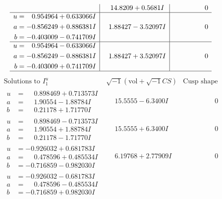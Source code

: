 \documentclass[1p]{elsarticle_modified}
\theoremstyle{definition}
\newcommand{\I}{\sqrt{-1}}
\begin{document}
$$\begin{array}{c|c|c}
 & \phantom{-}14.8209 + 0.5681 I & \phantom{-0.000000 } 0 \\ \hline\begin{aligned}
u &= \phantom{-}0.954964 + 0.633066 I \\
a &= -0.856249 + 0.886381 I \\
b &= -0.403009 - 0.741709 I\end{aligned}
 & \phantom{-}1.88427 - 3.52097 I & \phantom{-0.000000 } 0 \\ \hline\begin{aligned}
u &= \phantom{-}0.954964 - 0.633066 I \\
a &= -0.856249 - 0.886381 I \\
b &= -0.403009 + 0.741709 I\end{aligned}
 & \phantom{-}1.88427 + 3.52097 I & \phantom{-0.000000 } 0\\
 \hline 
 \end{array}$$\newpage$$\begin{array}{c|c|c}  
\text{Solutions to }I^u_{1}& \I (\text{vol} + \sqrt{-1}CS) & \text{Cusp shape}\\
 \hline 
\begin{aligned}
u &= \phantom{-}0.898469 + 0.713573 I \\
a &= \phantom{-}1.90554 - 1.88784 I \\
b &= \phantom{-}0.21178 + 1.71770 I\end{aligned}
 & \phantom{-}15.5555 - 6.3400 I & \phantom{-0.000000 } 0 \\ \hline\begin{aligned}
u &= \phantom{-}0.898469 - 0.713573 I \\
a &= \phantom{-}1.90554 + 1.88784 I \\
b &= \phantom{-}0.21178 - 1.71770 I\end{aligned}
 & \phantom{-}15.5555 + 6.3400 I & \phantom{-0.000000 } 0 \\ \hline\begin{aligned}
u &= -0.926032 + 0.681783 I \\
a &= \phantom{-}0.478596 + 0.485534 I \\
b &= -0.716859 - 0.982030 I\end{aligned}
 & \phantom{-}6.19768 + 2.77909 I & \phantom{-0.000000 } 0 \\ \hline\begin{aligned}
u &= -0.926032 - 0.681783 I \\
a &= \phantom{-}0.478596 - 0.485534 I \\
b &= -0.716859 + 0.982030 I\end{aligned}

\end{array}$$
\end{document}
